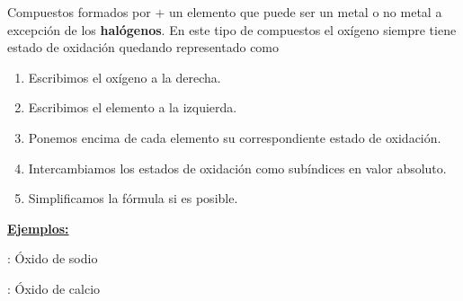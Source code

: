 \documentclass[11pt, a4paper]{article}
\begin{document}
Compuestos formados por  + un elemento que puede ser un metal o no metal a excepción de los \textbf{halógenos}.
En este tipo de compuestos el oxígeno siempre tiene estado de oxidación  quedando representado como  

\vspace*{8pt}

\begin{enumerate}[label=\itembolascolor{\arabic*}{green!50!black}]
    \item Escribimos el oxígeno a la derecha.
    \item Escribimos el elemento a la izquierda.
    \item Ponemos encima de cada elemento su correspondiente estado de oxidación.
    \item Intercambiamos los estados de oxidación como subíndices en valor absoluto.
    \item Simplificamos la fórmula si es posible.
\end{enumerate}

\textbf{\uline{Ejemplos:}}

 : Óxido de sodio \ch{->}   \ch{->} 

 : Óxido de calcio \ch{->}   \ch{->}  \ch{->} 

\vspace*{2mm}
\end{document}
